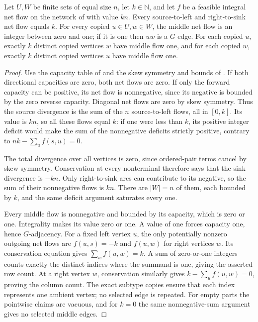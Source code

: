 \begin{lemma}
Let $U,W$ be finite sets of equal size $n$, let $k\in\mathbb N$, and let
$f$ be a feasible integral net flow on the network of
 with value $kn$.
Every source-to-left and right-to-sink net flow equals $k$.
For every copied $u\in U,w\in W$, the middle net flow is an integer
between zero and one; if it is one then $uw$ is a $G$ edge.
For each copied $u$, exactly $k$ distinct copied vertices $w$ have middle
flow one, and for each copied $w$, exactly $k$ distinct copied vertices
$u$ have middle flow one.
\end{lemma}
\begin{proof}
Use the capacity table of  and the skew
symmetry and bounds of . If both directional
capacities are zero, both net flows are zero. If only the forward
capacity can be positive, its net flow is nonnegative, since its negative
is bounded by the zero reverse capacity. Diagonal net flows are zero by
skew symmetry. Thus the source divergence is the sum of the $n$
source-to-left flows, all in $[0,k]$. Its value is $kn$, so all these
flows equal $k$: if one were less than $k$, its positive integer deficit
would make the sum of the nonnegative deficits strictly positive,
contrary to $nk-\sum_u f(s,u)=0$.

The total divergence over all vertices is zero, since ordered-pair terms
cancel by skew symmetry. Conservation at every nonterminal therefore
says that the sink divergence is $-kn$. Only right-to-sink arcs can
contribute to its negative, so the sum of their nonnegative flows is
$kn$. There are $|W|=n$ of them, each bounded by $k$, and the same
deficit argument saturates every one.

Every middle flow is nonnegative and bounded by its capacity, which is
zero or one. Integrality makes its value zero or one. A value of one
forces capacity one, hence $G$-adjacency. For a fixed left vertex $u$,
the only potentially nonzero outgoing net flows are $f(u,s)=-k$ and
$f(u,w)$ for right vertices $w$. Its conservation equation gives
$\sum_w f(u,w)=k$. A sum of zero-or-one integers counts exactly the
distinct indices where the summand is one, giving the asserted row
count. At a right vertex $w$, conservation similarly gives
$k-\sum_u f(u,w)=0$, proving the column count. The exact subtype copies
ensure that each index represents one ambient vertex; no selected edge
is repeated. For empty parts the pointwise claims are vacuous, and for
$k=0$ the same nonnegative-sum argument gives no selected middle edges.
\end{proof}
